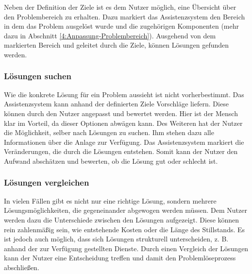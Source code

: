 Neben der Definition der Ziele ist es dem Nutzer möglich, eine Übersicht über den Problembereich zu erhalten. Dazu markiert das Assistenzsystem den Bereich in dem das Problem ausgelöst wurde und die zugehörigen Komponenten (mehr dazu in Abschnitt \ref{4:Anpassung-Problembereich}).
Ausgehend von dem markierten Bereich und geleitet durch die Ziele, können Lösungen gefunden werden.

\subsubsection*{Lösungen suchen}
Wie die konkrete Lösung für ein Problem aussieht ist nicht vorherbestimmt. Das Assistenzsystem kann anhand der definierten Ziele Vorschläge liefern. Diese können durch den Nutzer angepasst und bewertet werden. Hier ist der Mensch klar im Vorteil, da dieser Optionen abwägen kann. Des Weiteren hat der Nutzer die Möglichkeit, selber nach Lösungen zu suchen. Ihm stehen dazu alle Informationen über die Anlage zur Verfügung. Das Assistenzsystem markiert die Veränderungen, die durch die Lösungen entstehen. Somit kann der Nutzer den Aufwand abschätzen und bewerten, ob die Lösung gut oder schlecht ist.

\subsubsection*{Lösungen vergleichen}
In vielen Fällen gibt es nicht nur eine richtige Lösung, sondern mehrere Lösungsmöglichkeiten, die gegeneinander abgewogen werden müssen. Dem Nutzer werden dazu die Unterschiede zwischen den Lösungen aufgezeigt. Diese können rein zahlenmäßig sein, wie entstehende Kosten oder die Länge des Stillstands. Es ist jedoch auch möglich, dass sich Lösungen strukturell unterscheiden, z. B. anhand der zur Verfügung gestellten Dienste. Durch einen Vergleich der Lösungen kann der Nutzer eine Entscheidung treffen und damit den Problemlöseprozess abschließen.

